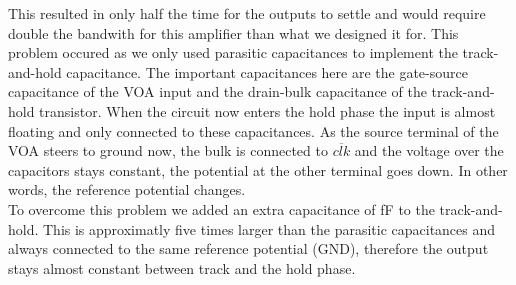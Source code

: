 This resulted in only half the time for the outputs to settle and would require double the bandwith for this amplifier than what we designed it for. This problem occured as we only used parasitic capacitances to implement the track-and-hold capacitance. The important capacitances here are the gate-source capacitance of the VOA input and the drain-bulk capacitance of the track-and-hold transistor. When the circuit now enters the hold phase the input is almost floating and only connected to these capacitances. As the source terminal of the VOA steers to ground now, the bulk is connected to $\overline{clk}$ and the voltage over the capacitors stays constant, the potential at the other terminal goes down. In other words, the reference potential changes.\\
To overcome this problem we added an extra capacitance of \unit[20]{fF} to the track-and-hold. This is approximatly five times larger than the parasitic capacitances and always connected to the same reference potential (GND), therefore the output stays almost constant between track and the hold phase.
